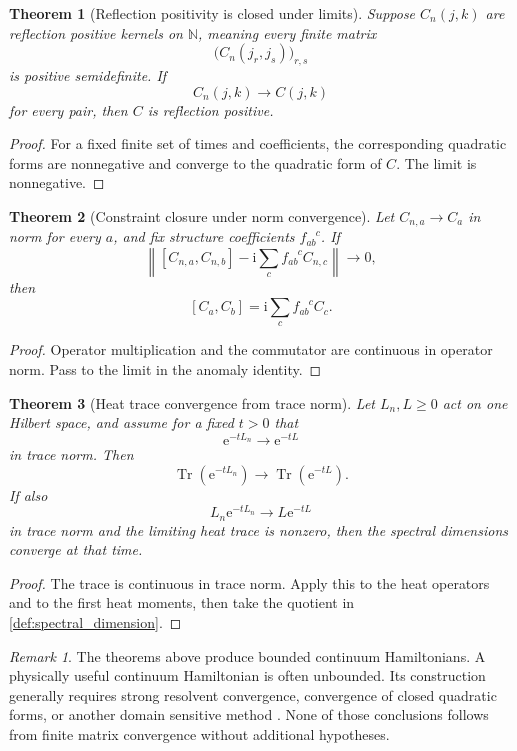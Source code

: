 \documentclass{aomart}
\newtheorem{theorem}{Theorem}[section]
\theoremstyle{definition}
\theoremstyle{remark}
\newtheorem{remark}[remark]{Remark}
\newcommand{\NN}{\mathbb N}
\newcommand{\Tr}{\operatorname{Tr}}
\newcommand{\e}{\mathrm e}
\newcommand{\ii}{\mathrm i}
\newcommand{\norm}[1]{\left\lVert#1\right\rVert}
\begin{document}
\begin{theorem}[Reflection positivity is closed under limits]\label{thm:reflection_limit}
Suppose \(C_n(j,k)\) are reflection positive kernels on \(\NN\), meaning every finite matrix
\[
\bigl(C_n(j_r,j_s)\bigr)_{r,s}
\]
is positive semidefinite. If
\[
C_n(j,k)\longrightarrow C(j,k)
\]
for every pair, then \(C\) is reflection positive.
\end{theorem}

\begin{proof}
For a fixed finite set of times and coefficients, the corresponding quadratic forms are nonnegative and converge to the quadratic form of \(C\). The limit is nonnegative.
\end{proof}

\begin{theorem}[Constraint closure under norm convergence]\label{thm:constraint_limit}
Let \(C_{n,a}\to C_a\) in norm for every \(a\), and fix structure coefficients \(f_{ab}^{\phantom{ab}c}\). If
\[
\norm{
[C_{n,a},C_{n,b}]
-\ii\sum_cf_{ab}^{\phantom{ab}c}C_{n,c}
}
\longrightarrow0,
\]
then
\[
[C_a,C_b]
=\ii\sum_cf_{ab}^{\phantom{ab}c}C_c.
\]
\end{theorem}

\begin{proof}
Operator multiplication and the commutator are continuous in operator norm. Pass to the limit in the anomaly identity.
\end{proof}

\begin{theorem}[Heat trace convergence from trace norm]\label{thm:trace_norm_heat}
Let \(L_n,L\geq0\) act on one Hilbert space, and assume for a fixed \(t>0\) that
\[
\e^{-tL_n}\longrightarrow\e^{-tL}
\]
in trace norm. Then
\[
\Tr(\e^{-tL_n})\longrightarrow\Tr(\e^{-tL}).
\]
If also
\[
L_n\e^{-tL_n}\longrightarrow L\e^{-tL}
\]
in trace norm and the limiting heat trace is nonzero, then the spectral dimensions converge at that time.
\end{theorem}

\begin{proof}
The trace is continuous in trace norm. Apply this to the heat operators and to the first heat moments, then take the quotient in \cref{def:spectral_dimension}.
\end{proof}

\begin{remark}\label{rem:unbounded_limit}
The theorems above produce bounded continuum Hamiltonians. A physically useful continuum Hamiltonian is often unbounded. Its construction generally requires strong resolvent convergence, convergence of closed quadratic forms, or another domain sensitive method \cite{Kato1995,ReedSimon1972}. None of those conclusions follows from finite matrix convergence without additional hypotheses.
\end{remark}
\end{document}
